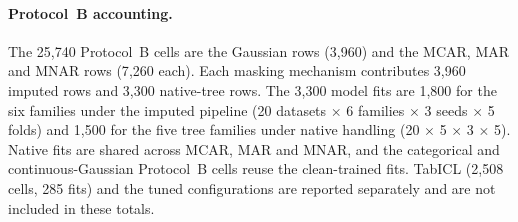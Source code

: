 \documentclass[pdflatex,sn-mathphys]{sn-jnl}
\theoremstyle{thmstyleone}
\theoremstyle{thmstyletwo}
\theoremstyle{thmstylethree}
\begin{document}
\paragraph{Protocol~B accounting.} The 25{,}740 Protocol~B cells are the Gaussian rows (3{,}960) and the MCAR, MAR and MNAR rows (7{,}260 each). Each masking mechanism contributes 3{,}960 imputed rows and 3{,}300 native-tree rows. The 3{,}300 model fits are 1{,}800 for the six families under the imputed pipeline (20 datasets $\times$ 6 families $\times$ 3 seeds $\times$ 5 folds) and 1{,}500 for the five tree families under native handling (20 $\times$ 5 $\times$ 3 $\times$ 5). Native fits are shared across MCAR, MAR and MNAR, and the categorical and continuous-Gaussian Protocol~B cells reuse the clean-trained fits. TabICL (2{,}508 cells, 285 fits) and the tuned configurations are reported separately and are not included in these totals.
\end{document}

